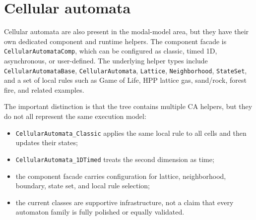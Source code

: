 \section{Cellular automata}
\label{sec:cellular-automata}

Cellular automata are also present in the modal-model area, but they have their
own dedicated component and runtime helpers. The component facade is
\texttt{CellularAutomataComp}, which can be configured as classic, timed 1D,
asynchronous, or user-defined. The underlying helper types include
\texttt{CellularAutomataBase}, \texttt{CellularAutomata}, \texttt{Lattice},
\texttt{Neighborhood}, \texttt{StateSet}, and a set of local rules such as
Game of Life, HPP lattice gas, sand/rock, forest fire, and related examples.

The important distinction is that the tree contains multiple CA helpers, but
they do not all represent the same execution model:
\begin{itemize}
\item \texttt{CellularAutomata\_Classic} applies the same local rule to all
  cells and then updates their states;
\item \texttt{CellularAutomata\_1DTimed} treats the second dimension as time;
\item the component facade carries configuration for lattice, neighborhood,
  boundary, state set, and local rule selection;
\item the current classes are supportive infrastructure, not a claim that every
  automaton family is fully polished or equally validated.
\end{itemize}

